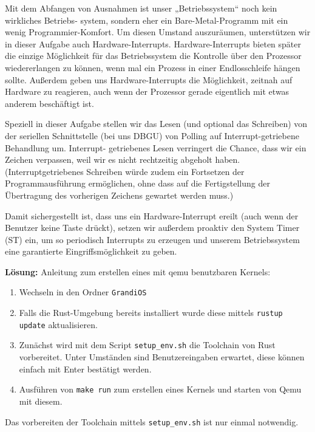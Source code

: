 \begin{description}

Mit dem Abfangen von Ausnahmen ist unser „Betriebssystem“ noch kein wirkliches Betriebs-
system, sondern eher ein Bare-Metal-Programm mit ein wenig Programmier-Komfort. Um 
diesen Umstand auszuräumen, unterstützen wir in dieser Aufgabe auch Hardware-Interrupts. 
Hardware-Interrupts bieten später die einzige Möglichkeit für das Betriebssystem die Kontrolle 
über den Prozessor wiedererlangen zu können, wenn mal ein Prozess in einer Endlosschleife 
hängen sollte. Außerdem geben uns Hardware-Interrupts die Möglichkeit, zeitnah auf Hardware 
zu reagieren, auch wenn der Prozessor gerade eigentlich mit etwas anderem beschäftigt ist. 

Speziell in dieser Aufgabe stellen wir das Lesen (und optional das Schreiben) von der seriellen 
Schnittstelle (bei uns DBGU) von Polling auf Interrupt-getriebene Behandlung um. Interrupt-
getriebenes Lesen verringert die Chance, dass wir ein Zeichen verpassen, weil wir es nicht 
rechtzeitig abgeholt haben. (Interruptgetriebenes Schreiben würde zudem ein Fortsetzen der 
Programmausführung ermöglichen, ohne dass auf die Fertigstellung der Übertragung des 
vorherigen Zeichens gewartet werden muss.) 

Damit sichergestellt ist, dass uns ein Hardware-Interrupt ereilt (auch wenn der Benutzer keine 
Taste drückt), setzen wir außerdem proaktiv den System Timer (ST) ein, um so periodisch 
Interrupts zu erzeugen und unserem Betriebssystem eine garantierte Eingriffsmöglichkeit zu 
geben. 
  

\pagebreak
\textbf{Lösung:}
Anleitung zum erstellen eines mit qemu benutzbaren Kernels:
\begin{enumerate}
  \item Wechseln in den Ordner \texttt{GrandiOS}
  \item Falls die Rust-Umgebung bereits installiert wurde diese mittels \texttt{rustup update} aktualisieren.
  \item Zunächst wird mit dem Script \texttt{setup\_env.sh} die Toolchain von Rust vorbereitet. Unter Umständen sind Benutzereingaben erwartet, diese können einfach mit Enter bestätigt werden.
  \item Ausführen von \texttt{make run} zum erstellen eines Kernels und starten von Qemu mit diesem.
\end{enumerate}
Das vorbereiten der Toolchain mittels \texttt{setup\_env.sh} ist nur einmal notwendig.


\end{description}
